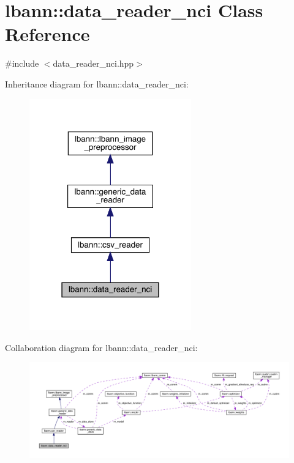 \hypertarget{classlbann_1_1data__reader__nci}{}\section{lbann\+:\+:data\+\_\+reader\+\_\+nci Class Reference}
\label{classlbann_1_1data__reader__nci}


{\ttfamily \#include $<$data\+\_\+reader\+\_\+nci.\+hpp$>$}



Inheritance diagram for lbann\+:\+:data\+\_\+reader\+\_\+nci\+:\nopagebreak
\begin{figure}[H]
\begin{center}
\leavevmode
\includegraphics[width=198pt]{classlbann_1_1data__reader__nci__inherit__graph}
\end{center}
\end{figure}


Collaboration diagram for lbann\+:\+:data\+\_\+reader\+\_\+nci\+:\nopagebreak
\begin{figure}[H]
\begin{center}
\leavevmode
\includegraphics[width=350pt]{classlbann_1_1data__reader__nci__coll__graph}
\end{center}
\end{figure}
